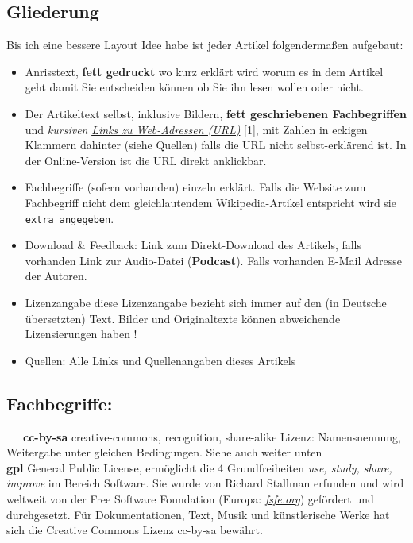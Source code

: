 
\subsection*{Gliederung}
Bis ich eine bessere Layout Idee habe ist jeder Artikel folgendermaßen aufgebaut:
\begin{itemize}
\item Anrisstext, \textbf{fett gedruckt} wo kurz erklärt wird worum es in dem Artikel geht damit Sie entscheiden können ob Sie ihn lesen wollen oder nicht.
\item Der Artikeltext selbst, inklusive Bildern, \textbf{fett geschriebenen Fachbegriffen} und \textit{kursiven} \href{http://spielend-programmieren.at}{\textit{Links zu Web-Adressen (URL)}} [1], mit Zahlen in eckigen Klammern dahinter (siehe Quellen) falls die URL nicht selbst-erklärend ist. In der Online-Version ist die URL direkt anklickbar.
\item Fachbegriffe (sofern vorhanden) einzeln erklärt. Falls die Website zum Fachbegriff nicht dem gleichlautendem Wikipedia-Artikel entspricht wird sie \texttt{extra angegeben}.
\item Download \& Feedback: Link zum Direkt-Download des Artikels, falls vorhanden Link zur Audio-Datei (\textbf{Podcast}). Falls vorhanden E-Mail Adresse der Autoren.
\item Lizenzangabe diese Lizenzangabe bezieht sich immer auf den (in Deutsche übersetzten) Text. Bilder und Originaltexte können abweichende Lizensierungen haben ! 
\item Quellen: Alle Links und Quellenangaben dieses Artikels
\end{itemize}

\subsection*{Fachbegriffe:}

~~~\textbf{cc-by-sa} creative-commons, recognition, share-alike Lizenz:  Namensnennung, Weitergabe unter gleichen Bedingungen. Siehe auch weiter unten \\

\textbf{gpl} General Public License, ermöglicht die 4 Grundfreiheiten \emph{use, study, share, improve} im Bereich Software. Sie wurde von Richard Stallman erfunden und wird weltweit von der Free Software Foundation (Europa: \href{http://fsfe.org/}{\textit{fsfe.org}}) gefördert und durchgesetzt. Für Dokumentationen, Text, Musik und künstlerische Werke hat sich die Creative Commons Lizenz cc-by-sa bewährt. \\

